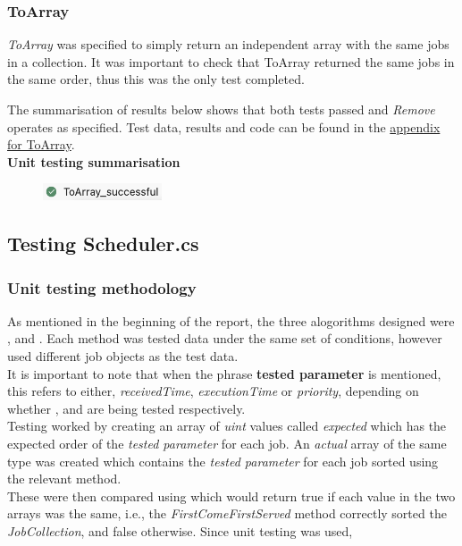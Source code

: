 \documentclass[a4paper]{article}
\begin{document}
\subsubsection{ToArray}
\textit{ToArray} was specified to simply return an independent array with the same jobs in a collection. It was important to check that ToArray returned the same jobs in the same order, thus this was the only test completed.

The summarisation of results below shows that both tests passed and \textit{Remove} operates as specified. Test data, results and code can be found in the \hyperlink{subsubsection.5.2.5}{appendix for ToArray}.
\\[6pt]
\textbf{Unit testing summarisation}
\begin{figure}[H]
   \includegraphics[height=0.5cm]{images/ToArray-summary.png}
\end{figure}

\subsection{Testing Scheduler.cs}
\subsubsection{Unit testing methodology}
As mentioned in the beginning of the report, the three alogorithms designed were ,  and . Each method was tested data under the same set of conditions, however used different job objects as the test data.
\\[3pt] 
It is important to note that when the phrase \textbf{tested parameter} is mentioned, this refers to either, \textit{receivedTime}, \textit{executionTime} or \textit{priority}, depending on whether ,  and  are being tested respectively. 
\\[6pt]
Testing worked by creating an array of \textit{uint} values called \textit{expected} which has the expected order of the \textit{tested parameter} for each job. An \textit{actual} array of the same type was created which contains the \textit{tested parameter} for each job sorted using the relevant method. 
\\[3pt]
These were then compared using  which would return true if each value in the two arrays was the same, i.e., the \textit{FirstComeFirstServed} method correctly sorted the \textit{JobCollection}, and false otherwise. Since unit testing was used, 
\end{document}
